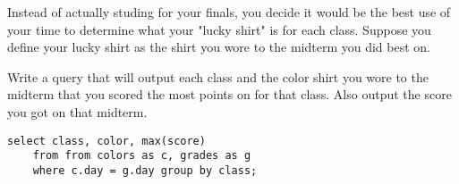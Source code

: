 \begin{blocksection}
\question 
Instead of actually studing for your finals, you decide it would be the best use of your time to determine what your "lucky shirt" is for each class. Suppose you define your lucky shirt as the shirt you wore to the midterm you did best on.

Write a query that will output each class and the color shirt you wore to the midterm that you scored the most points on for that class. Also output the score you got on that midterm.

\begin{solution}[1.5in]
\begin{lstlisting}
select class, color, max(score)
    from from colors as c, grades as g
    where c.day = g.day group by class;
\end{lstlisting}
\end{solution}
\end{blocksection}